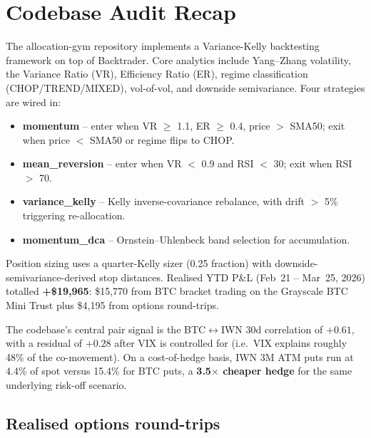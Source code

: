 \documentclass[11pt,letterpaper]{article}
\begin{document}
\section{Codebase Audit Recap}

The allocation-gym repository implements a Variance-Kelly backtesting
framework on top of Backtrader. Core analytics include Yang--Zhang
volatility, the Variance Ratio (VR), Efficiency Ratio (ER), regime
classification (CHOP/TREND/MIXED), vol-of-vol, and downside
semivariance. Four strategies are wired in:

\begin{itemize}[nosep]
  \item \textbf{momentum} -- enter when VR $\geq$ 1.1, ER $\geq$ 0.4,
        price $>$ SMA50; exit when price $<$ SMA50 or regime flips to CHOP.
  \item \textbf{mean\_reversion} -- enter when VR $<$ 0.9 and RSI $<$ 30;
        exit when RSI $>$ 70.
  \item \textbf{variance\_kelly} -- Kelly inverse-covariance rebalance,
        with drift $>$ 5\% triggering re-allocation.
  \item \textbf{momentum\_dca} -- Ornstein--Uhlenbeck band selection for
        accumulation.
\end{itemize}

Position sizing uses a quarter-Kelly sizer (0.25 fraction) with
downside-semivariance-derived stop distances. Realised YTD P\&L
(Feb~21 -- Mar~25, 2026) totalled \textcolor{gain}{\textbf{+\$19{,}965}}:
\$15{,}770 from BTC bracket trading on the Grayscale BTC Mini Trust
plus \$4{,}195 from options round-trips.

The codebase's central pair signal is the BTC$\leftrightarrow$IWN 30d
correlation of $+0.61$, with a residual of $+0.28$ after VIX is
controlled for (i.e.\ VIX explains roughly 48\% of the co-movement).
On a cost-of-hedge basis, IWN 3M ATM puts run at 4.4\% of spot versus
15.4\% for BTC puts, a \textbf{3.5$\times$ cheaper hedge} for the same
underlying risk-off scenario.

\subsection{Realised options round-trips}
\end{document}

